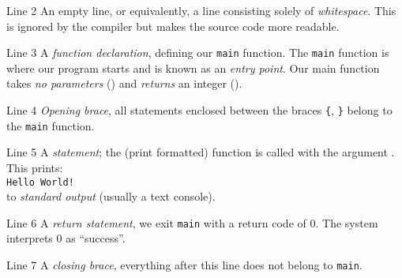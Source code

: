 \documentclass[smaller,table]{beamer} %
\begin{document}
\begin{frame}
\begin{block}{Line 2}
An empty line, or equivalently, a line consisting solely of \emph{whitespace}. This is ignored by the compiler but makes the source code more readable.\end{block}

\begin{block}{Line 3}
A \emph{function declaration}, defining our {\tt main} function. The
{\tt main} function is where our program starts and is known as an
\emph{entry point}. Our main function takes \emph{no parameters} () and \emph{returns} an integer ().
\end{block}

\begin{block}{Line 4}
\emph{Opening brace}, all statements enclosed between the braces {\tt\{}, {\tt\}} belong to the {\tt main} function.
\end{block}

\end{frame}

\begin{frame}
\begin{block}{Line 5}
A \emph{statement}; the  (print formatted) function is called with the argument . This prints:\\
{\tt Hello World!}\\
to \emph{standard output} (usually a text console).
\end{block}

\begin{block}{Line 6}
A \emph{return statement}, we exit {\tt main} with a return code of 0. The system interprets 0 as ``success''.
\end{block}


\begin{block}{Line 7}
A \emph{closing brace}, everything after this line does not belong to
{\tt main}.
\end{block}

\end{frame}
\end{document}
